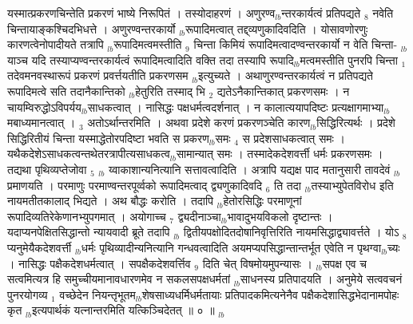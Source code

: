 \documentclass[article,12pt,a4paper]{memoir}%
\newcounter{parCount}
\begin{document}
	  
	  \pstart \leavevmode%
	यस्मात्प्रकरणचिन्तेति प्रकरणं भाष्ये निरूपितं । तस्योदाहरणं । अणुरण्व{\tiny $_{lb}$}न्तरकार्यत्वं प्रतिपद्यते {\tiny $_{8}$} नवेति चिन्तायाङ्कश्चिदभिधत्ते । अणुरण्वन्तरकार्यो {\tiny $_{lb}$}रूपादिमत्वात् तद्द्व्यणुकादिवदिति । योसावणोरणुः कारणत्वेनोपादीयते तत्रापि {\tiny $_{lb}$}रूपादिमत्वमस्तीति {\tiny $_{9}$} \leavevmode{} चिन्ता किमियं रूपादिमत्वादण्वन्तरकार्यो न वेति चिन्ता- {\tiny $_{lb}$}याञ्च यदि तस्याप्यण्वन्तरकार्यत्वं रूपादिमत्वादिति वक्ति तदा तस्यापि रूपादि{\tiny $_{lb}$}मत्वमस्तीति पुनरपि चिन्ता {\tiny $_{1}$} तदेवमनवस्थारूपं प्रकरणं प्रवर्त्तयतीति प्रकरणसम {\tiny $_{lb}$}इत्युच्यते । अथाणुरण्वन्तरकार्यत्वं न प्रतिपद्यते रूपादिमत्वे सति तदानैकान्तिको {\tiny $_{lb}$}हेतुरिति तस्माद् भि {\tiny $_{2}$} द्यतेऽनैकान्तिकात् प्रकरणसमः । न चायम्विरुद्धोऽविपर्यय{\tiny $_{lb}$}साधकत्वात् । नासिद्धः पक्षधर्मत्वदर्शनात् । न कालात्ययापदिष्टः प्रत्यक्षागमाभ्या{\tiny $_{lb}$}मबाध्यमानत्वात् । {\tiny $_{3}$} अतोऽर्थान्तरमिति । अथवा प्रदेशे करणं प्रकरणञ्चेति कारण{\tiny $_{lb}$}सिद्धिरित्यर्थः । प्रदेशे सिद्धिरितीयं चिन्ता यस्माद्धेतोरपदिष्टा भवति स प्रकरण{\tiny $_{lb}$}समः {\tiny $_{4}$} स प्रदेशसाधकत्वात् समः । यथैकदेशेऽसाधकत्वन्तथेतरत्रापीत्यसाधकत्व{\tiny $_{lb}$}सामान्यात् समः । तस्मादेकदेशवर्त्ती धर्मः प्रकरणसमः । तद्यथा पृथिव्यप्तेजोवा {\tiny $_{5}$} {\tiny $_{lb}$} य्वाकाशान्यनित्यानि सत्तावत्वादिति । अत्रापि यद्यक्ष {\color{DodgerBlue3}पाद} मतानुसारी तावदेवं {\tiny $_{lb}$}प्रमाणयति । परमाणुः परमाण्वन्तरपूर्व्वको रूपादिमत्वाद् द्व्यणुकादिवदि {\tiny $_{6}$} ति तदा {\tiny $_{lb}$}तस्याभ्युपेतविरोध इति नायमतीतकालाद् भिद्यते । अथ {\color{DodgerBlue3}बौद्धः} करोति । तदापि {\tiny $_{lb}$}हेतोरसिद्धिः परमाणूनां रूपादिव्यतिरेकेणानभ्युपगमात् । अयोगाच्च {\tiny $_{7}$} द्व्यदीनाञ्चा{\tiny $_{lb}$}भावादुभयविकलो दृष्टान्तः । यदाप्यनपेक्षितसिद्धान्तो न्यायवादी ब्रूते तदापि {\tiny $_{lb}$} \leavevmode{} द्वितीयपक्षोदितदोषानिवृत्तिरिति नायमसिद्धाद्व्यावर्त्तते । योऽ {\tiny $_{8}$} प्यनुमेयैकदेशवर्त्ती {\tiny $_{lb}$}धर्मः पृथिव्यादीन्यनित्यानि गन्धवत्वादिति अयमप्यपसिद्धान्तान्तर्भूत एवेति न पृथग्वा{\tiny $_{lb}$}च्यः । नासिद्धः पक्षैकदेशधर्मत्वात् । सपक्षैकदेशवर्त्तिव {\tiny $_{9}$} \leavevmode{} दिति चेत् विषमोयमुपन्यासः । {\tiny $_{lb}$}सपक्ष एव च सत्वमित्यत्र हि समुच्चीयमानावधारणमेव न सकलसपक्षधर्मतां {\tiny $_{lb}$}साधनस्य प्रतिपादयति । अनुमेये सत्ववचनं पुनरयोगव्य {\tiny $_{1}$} वच्छेदेन नियन्तृभूतम{\tiny $_{lb}$}शेषसाध्यधर्मिधर्मतायाः प्रतिपादकमित्यनेनैव पक्षैकदेशासिद्धभेदानामपोहः कृत {\tiny $_{lb}$}इत्यपार्थकं यत्नान्तरमिति यत्किञ्चिदेतत् ॥ ० ॥
	{}
	\pend%
      {\tiny $_{lb}$}
\end{document}
